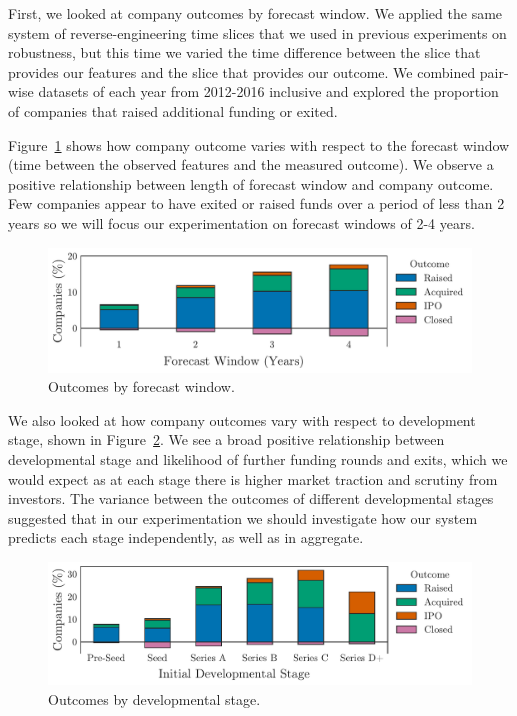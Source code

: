 \documentclass[../thesis/thesis.tex]{subfiles}
\begin{document}
First, we looked at company outcomes by forecast window. We applied the same system of reverse-engineering time slices that we used in previous experiments on robustness, but this time we varied the time difference between the slice that provides our features and the slice that provides our outcome. We combined pair-wise datasets of each year from 2012-2016 inclusive and explored the proportion of companies that raised additional funding or exited.

Figure~\ref{fig:evaluation:outcome_forecast_window} shows how company outcome varies with respect to the forecast window (time between the observed features and the measured outcome). We observe a positive relationship between length of forecast window and company outcome. Few companies appear to have exited or raised funds over a period of less than 2 years so we will focus our experimentation on forecast windows of 2-4 years.

\begin{figure}[!htb]
    \centering
    \includegraphics[width=\textwidth]{../figures/evaluation/outcomes_window}
    \caption[Outcomes by forecast window]{Outcomes by forecast window.}
    \label{fig:evaluation:outcome_forecast_window}
\end{figure}

We also looked at how company outcomes vary with respect to development stage, shown in Figure~\ref{fig:evaluation:outcome_stage}. We see a broad positive relationship between developmental stage and likelihood of further funding rounds and exits, which we would expect as at each stage there is higher market traction and scrutiny from investors. The variance between the outcomes of different developmental stages suggested that in our experimentation we should investigate how our system predicts each stage independently, as well as in aggregate.

\begin{figure}[!htb]
    \centering
    \includegraphics[width=\textwidth]{../figures/evaluation/outcomes_stage}
    \caption[Outcomes by developmental stage]{Outcomes by developmental stage.}
    \label{fig:evaluation:outcome_stage}
\end{figure}
\end{document}
